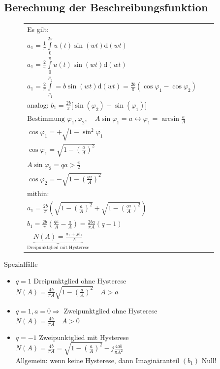 \documentclass[11pt,a4paper]{article}
\begin{document}
\subsection{Berechnung der Beschreibungsfunktion}
\begin{figure}[htbp]
\begin{minipage}[c]{8.0cm}
\def\svgwidth{180pt} 
  
\end{minipage}
\begin{minipage}[c]{7cm}

\begin{tabular}{lll}
Es gilt: &&\\
$a_1 = \frac{1}{\pi} \int\limits_{0}^{2\pi} u(t) \sin{(wt)} \mathrm{d}(wt)$ &&\\
$a_1 = \frac{2}{\pi} \int\limits_{0}^{\pi} u(t) \sin{(wt)} \mathrm{d}(wt)$ &&\\
$a_1 = \frac{2}{\pi} \int\limits_{\varphi_1}^{\varphi_2}  = b\sin{(wt)} \mathrm{d}(wt) = \frac{2b}{\pi} (\cos{\varphi_1} - \cos{\varphi_2})$&&\\
analog:
$b_1 = \frac{2b}{\pi}\Big[ \sin{(\varphi_2)} - \sin{(\varphi_1)}\Big]$ &&\\
$\text{Bestimmung } \varphi_1, \varphi_2, \quad A\sin{\varphi_1} = a \leftrightarrow \varphi_1 = \arcsin{\frac{a}{A}} $&&\\
$\cos{\varphi_1} = +\sqrt{1 - \sin^2{\varphi_1}} $&&\\
$\cos{\varphi_1} = \sqrt{1 - (\frac{a}{A})^2}$ &&\\
$A\sin{\varphi_2} = q a > \frac{\pi}{2}$&&\\
$\cos{\varphi_2} = - \sqrt{1- (\frac{qa}{A})^2}$&&\\
$\text{mithin: }$&&\\
$a_1 = \frac{2b}{\pi} \left(  \sqrt{1- (\frac{a}{A})^2} + \sqrt{1- (\frac{qa}{A})^2}   \right)$&&\\
$b_1 = \frac{2b}{\pi} \left(  \frac{qa}{A} - \frac{a}{A}\right) = \frac{2ba}{\pi A} (q-1)$&&\\
$\underbrace{N(A) = \frac{a_1 + jb_1}{A}}_{\text{Dreipunktglied mit Hysterese}}$&&
\end{tabular}
\end{minipage}
\end{figure} 
Spezialfälle
\begin{itemize}
\item $q=1$ Dreipunktglied ohne Hysterese\\
$ N(A) = \frac{4b}{\pi A} \sqrt{ 1- (\frac{a}{A})^2} \quad A>a $
\item $q=1, a=0 \Rightarrow$ Zweipunktglied ohne Hysterese\\
$N(A) = \frac{4b}{\pi A} \quad A>0 $
\item $q=-1$ Zweipunktglied mit Hysterese \\
$N(A) = \frac{4b}{\pi A} = \sqrt{ 1 - (\frac{a}{A})^2 } - j \frac{4ab}{\pi A^2} $\\
Allgemein: wenn keine Hysterese, dann Imaginäranteil $(b_1)$ Null!
\end{itemize}
\end{document}
